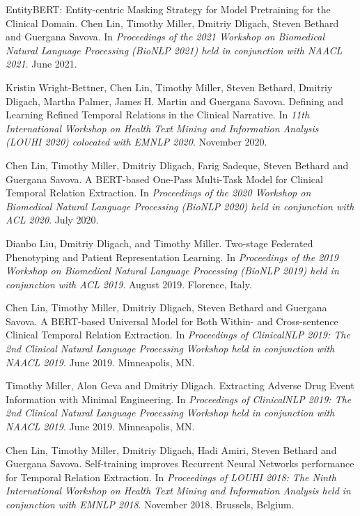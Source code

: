 \documentclass[letterpaper]{article}
\renewenvironment{itemize}{
  \begin{list}{}{
    \setlength{\leftmargin}{1.5em}
  }
}{
  \end{list}
}
\begin{document}
\begin{itemize}
\item EntityBERT: Entity-centric Masking Strategy for Model Pretraining for the Clinical Domain. Chen Lin, Timothy Miller, Dmitriy Dligach, Steven Bethard and Guergana Savova. In \emph{Proceedings of the 2021 Workshop on Biomedical Natural Language Processing (BioNLP 2021) held in conjunction with NAACL 2021}. June 2021.
\item Kristin Wright-Bettner, Chen Lin, Timothy Miller, Steven Bethard, Dmitriy Dligach, Martha Palmer, James H. Martin and Guergana Savova. Defining and Learning Refined Temporal Relations in the Clinical Narrative. In \emph{11th International Workshop on Health Text Mining and Information Analysis (LOUHI 2020) colocated with EMNLP 2020}. November 2020.
\item Chen Lin, Timothy Miller, Dmitriy Dligach, Farig Sadeque, Steven Bethard and Guergana Savova. A BERT-based One-Pass Multi-Task Model for Clinical Temporal Relation Extraction. In \emph{Proceedings of the 2020 Workshop on Biomedical Natural Language Processing (BioNLP 2020) held in conjunction with ACL 2020}. July 2020.
\item Dianbo Liu, Dmitriy Dligach, and Timothy Miller. Two-stage Federated Phenotyping and Patient Representation Learning. In \emph{Proceedings of the 2019 Workshop on Biomedical Natural Language Processing (BioNLP 2019) held in conjunction with ACL 2019}. August 2019. Florence, Italy.
\item Chen Lin, Timothy Miller, Dmitriy Dligach, Steven Bethard and Guergana Savova. A BERT-based Universal Model for Both Within- and Cross-sentence Clinical Temporal Relation Extraction. In \emph{Proceedings of ClinicalNLP 2019: The 2nd Clinical Natural Language Processing Workshop held in conjunction with NAACL 2019}. June 2019. Minneapolis, MN.
\item Timothy Miller, Alon Geva and Dmitriy Dligach. Extracting Adverse Drug Event Information with Minimal Engineering. In \emph{Proceedings of ClinicalNLP 2019: The 2nd Clinical Natural Language Processing Workshop held in conjunction with NAACL 2019}. June 2019. Minneapolis, MN.
\item Chen Lin, Timothy Miller, Dmitriy Dligach, Hadi Amiri, Steven Bethard and Guergana Savova. Self-training improves Recurrent Neural Networks performance for Temporal Relation Extraction. In \emph{Proceedings of LOUHI 2018: The Ninth International Workshop on Health Text Mining and Information Analysis held in conjunction with EMNLP 2018}. November 2018. Brussels, Belgium.

\end{itemize}
\end{document}
